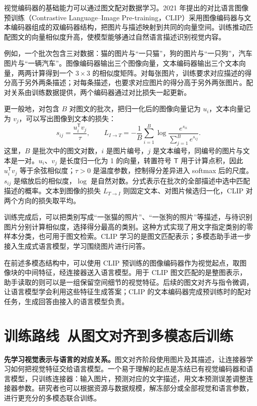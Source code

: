 视觉编码器的基础能力可以通过图文配对数据学习。2021 年提出的对比语言图像预训练（Contrastive Language--Image Pre-training，CLIP）采用图像编码器与文本编码器组成的双编码器结构，把图片与描述映射到共同的向量空间。训练推动匹配图文的向量相似度升高，使模型能够通过自然语言描述识别视觉内容。

例如，一个批次包含三对数据：猫的图片与``一只猫''，狗的图片与``一只狗''，汽车图片与``一辆汽车''。图像编码器输出三个图像向量，文本编码器输出三个文本向量，两两计算得到一个 $3\times3$ 的相似度矩阵。对每张图片，训练要求对应描述的得分高于另外两条描述；对每条描述，也要求对应图片的得分高于另外两张图片。配对关系由训练数据提供，两个编码器通过对比损失一起更新。

更一般地，对包含 $B$ 对图文的批次，把归一化后的图像向量记为 $u_i$，文本向量记为 $v_j$，可以写出图像到文本的损失：
\[
s_{ij}=\frac{u_i^{\mathsf T}v_j}{\tau},\qquad
L_{I\to T}=-\frac1B\sum_{i=1}^{B}
\log\frac{e^{s_{ii}}}{\sum_{j=1}^{B}e^{s_{ij}}}.
\]
这里，$B$ 是批次中的图文对数，$i$ 是图片编号，$j$ 是文本编号，同编号的图片与文本是一对。$u_i$、$v_j$ 是长度归一化为 1 的向量，转置符号 $\mathsf T$ 用于计算点积，因此 $u_i^{\mathsf T}v_j$ 等于余弦相似度；$\tau>0$ 是温度参数，控制得分差异进入 softmax 后的尺度。$s_{ij}$ 是缩放后的相似度，$\log$ 是自然对数。分式表示在批次的全部描述中选中匹配描述的概率。文本到图像的损失 $L_{T\to I}$ 则固定文本、对图片候选归一化，CLIP 对两个方向的损失取平均。

训练完成后，可以把类别写成``一张猫的照片''、``一张狗的照片''等描述，与待识别图片分别计算相似度，选择得分最高的类别。这种方式实现了用文字指定类别的零样本分类，也可用于图文检索。CLIP 学习的是图文匹配表示；多模态助手进一步接入生成式语言模型，学习围绕图片进行问答。

在前述多模态结构中，可以使用 CLIP 预训练的图像编码器作为视觉起点，取图像块的中间特征，经连接器送入语言模型。用于 CLIP 图文匹配的是整图表示，助手读取的则可以是一组保留空间细节的视觉特征。后续的图文对齐与指令微调，让语言模型学会利用这些特征生成答案；CLIP 的文本编码器完成预训练时的配对任务，生成回答由接入的语言模型负责。

\section{训练路线~从图文对齐到多模态后训练}

\textbf{先学习视觉表示与语言的对应关系。}图文对齐阶段使用图片及其描述，让连接器学习如何把视觉特征交给语言模型。一个易于理解的起点是冻结已有视觉编码器和语言模型，只训练连接器：输入图片，预测对应的文字描述，用文本预测误差调整连接器参数。研究者也可以根据资源与数据规模，解冻部分或全部视觉和语言参数，进行更充分的多模态联合训练。

